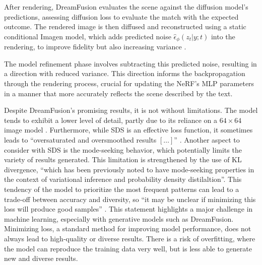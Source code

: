 After rendering, DreamFusion evaluates the scene against the diffusion model's predictions, assessing diffusion loss to evaluate the match with the expected outcome. The rendered image is then diffused and reconstructed using a static conditional Imagen model, which adds predicted noise \( \hat{\epsilon}_\phi(z_t | y; t) \) into the rendering, to improve fidelity but also increasing variance \citep{pooleDreamfusion}.

The model refinement phase involves subtracting this predicted noise, resulting in a direction with reduced variance. This direction informs the backpropagation through the rendering process, crucial for updating the NeRF's MLP parameters in a manner that more accurately reflects the scene described by the text.

Despite DreamFusion's promising results, it is not without limitations. The model tends to exhibit a lower level of detail, partly due to its reliance on a \( 64 \times 64 \) image model \citep{lin2023magic3d}. Furthermore, while SDS is an effective loss function, it sometimes leads to ``oversaturated and oversmoothed results \([\ldots]\)'' \citep{pooleDreamfusion}. Another aspect to consider with SDS is the mode-seeking behavior, which potentially limits the variety of results generated. This limitation is strengthened by the use of KL divergence, ``which has been previously noted to have mode-seeking properties in the context of variational inference and probability density distilaltion''\citep{pooleDreamfusion}. This tendency of the model to prioritize the most frequent patterns can lead to a trade-off between accuracy and diversity, so ``it may be unclear if minimizing this loss will produce good samples'' \citep{pooleDreamfusion}. This statement highlights a major challenge in machine learning, especially with generative models such as DreamFusion. Minimizing loss, a standard method for improving model performance, does not always lead to high-quality or diverse results. There is a risk of overfitting, where the model can reproduce the training data very well, but is less able to generate new and diverse results.